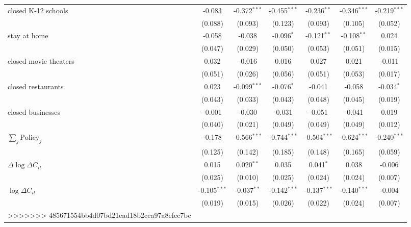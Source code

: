 \begin{tabular}{lccccc|>{}c}
closed K-12 schools & -0.083 & -0.372$^{***}$ & -0.455$^{***}$ & -0.236$^{**}$ & -0.346$^{***}$ & -0.219$^{***}$\\
 & (0.088) & (0.093) & (0.123) & (0.093) & (0.105) & (0.052)\\
stay at home & -0.058 & -0.038 & -0.096$^{*}$ & -0.121$^{**}$ & -0.108$^{**}$ & 0.024\\
 & (0.047) & (0.029) & (0.050) & (0.053) & (0.051) & (0.015)\\
closed movie theaters & 0.032 & -0.016 & 0.016 & 0.027 & 0.021 & -0.011\\
 & (0.051) & (0.026) & (0.056) & (0.051) & (0.053) & (0.017)\\
closed restaurants & 0.023 & -0.099$^{***}$ & -0.076$^{*}$ & -0.041 & -0.058 & -0.034$^{*}$\\
 & (0.043) & (0.033) & (0.043) & (0.048) & (0.045) & (0.019)\\
closed businesses & -0.001 & -0.030 & -0.031 & -0.051 & -0.041 & 0.019\\
 & (0.040) & (0.021) & (0.049) & (0.049) & (0.049) & (0.012)\\
$\sum_j \mathrm{Policy}_j$ & -0.178 & -0.566$^{***}$ & -0.744$^{***}$ & -0.504$^{***}$ & -0.624$^{***}$ & -0.240$^{***}$\\
 & (0.125) & (0.142) & (0.185) & (0.148) & (0.165) & (0.059)\\
$\Delta \log \Delta C_{it}$ & 0.015 & 0.020$^{**}$ & 0.035 & 0.041$^{*}$ & 0.038 & -0.006\\
 & (0.025) & (0.010) & (0.025) & (0.024) & (0.024) & (0.007)\\
$\log \Delta C_{it}$ & -0.105$^{***}$ & -0.037$^{**}$ & -0.142$^{***}$ & -0.137$^{***}$ & -0.140$^{***}$ & -0.004\\
 & (0.019) & (0.015) & (0.026) & (0.022) & (0.024) & (0.007)\\
>>>>>>> 485671554bb4d07bd21ead18b2cca97a8efec7bc
\bottomrule
\end{tabular}